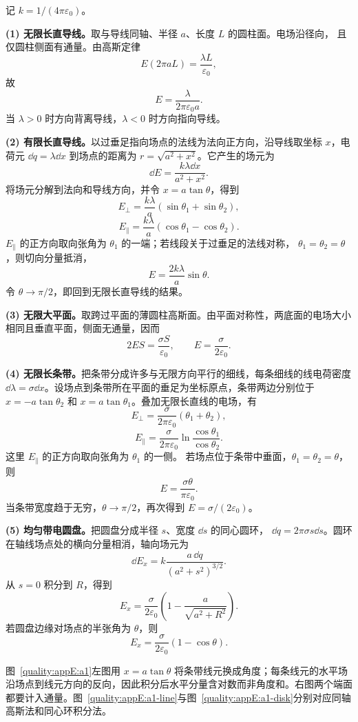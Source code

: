 \begin{xesolution}
记 $k=1/(4\pi\varepsilon_0)$。

\textbf{(1) 无限长直导线。}取与导线同轴、半径 $a$、长度 $L$ 的圆柱面。电场沿径向，
且仅圆柱侧面有通量。由高斯定律
\[
  E(2\pi aL)=\frac{\lambda L}{\varepsilon_0},
\]
故
\[
  \boxed{E=\frac{\lambda}{2\pi\varepsilon_0a}}.
\]
当 $\lambda>0$ 时方向背离导线，$\lambda<0$ 时方向指向导线。

\textbf{(2) 有限长直导线。}以过垂足指向场点的法线为法向正方向，沿导线取坐标 $x$，电荷元
$\dd q=\lambda\dd x$ 到场点的距离为 $r=\sqrt{a^2+x^2}$。它产生的场元为
\[
  \dd E=\frac{k\lambda\dd x}{a^2+x^2}.
\]
将场元分解到法向和导线方向，并令 $x=a\tan\theta$，得到
\[
  \boxed{E_\perp=\frac{k\lambda}{a}
  (\sin\theta_1+\sin\theta_2)},
\]
\[
  \boxed{E_\parallel=\frac{k\lambda}{a}
  (\cos\theta_1-\cos\theta_2)}.
\]
$E_\parallel$ 的正方向取向张角为 $\theta_1$ 的一端；若线段关于过垂足的法线对称，
$\theta_1=\theta_2=\theta$，则切向分量抵消，
\[
  \boxed{E=\frac{2k\lambda}{a}\sin\theta}.
\]
令 $\theta\to\pi/2$，即回到无限长直导线的结果。

\textbf{(3) 无限大平面。}取跨过平面的薄圆柱高斯面。由平面对称性，两底面的电场大小
相同且垂直平面，侧面无通量，因而
\[
  2ES=\frac{\sigma S}{\varepsilon_0},
  \qquad
  \boxed{E=\frac{\sigma}{2\varepsilon_0}}.
\]

\textbf{(4) 无限长条带。}把条带分成许多与无限方向平行的细线，每条细线的线电荷密度
$\dd\lambda=\sigma\dd x$。设场点到条带所在平面的垂足为坐标原点，条带两边分别位于
$x=-a\tan\theta_2$ 和 $x=a\tan\theta_1$。叠加无限长直线的电场，有
\[
  \boxed{E_\perp=\frac{\sigma}{2\pi\varepsilon_0}
  (\theta_1+\theta_2)},
\]
\[
  \boxed{E_\parallel=
  \frac{\sigma}{2\pi\varepsilon_0}
  \ln\frac{\cos\theta_1}{\cos\theta_2}}.
\]
这里 $E_\parallel$ 的正方向取向张角为 $\theta_1$ 的一侧。
若场点位于条带中垂面，$\theta_1=\theta_2=\theta$，则
\[
  \boxed{E=\frac{\sigma\theta}{\pi\varepsilon_0}}.
\]
当条带宽度趋于无穷，$\theta\to\pi/2$，再次得到 $E=\sigma/(2\varepsilon_0)$。

\textbf{(5) 均匀带电圆盘。}把圆盘分成半径 $s$、宽度 $\dd s$ 的同心圆环，
$\dd q=2\pi\sigma s\dd s$。圆环在轴线场点处的横向分量相消，轴向场元为
\[
  \dd E_x=k\frac{a\,\dd q}{(a^2+s^2)^{3/2}}.
\]
从 $s=0$ 积分到 $R$，得到
\[
  \boxed{E_x=\frac{\sigma}{2\varepsilon_0}
  \left(1-\frac{a}{\sqrt{a^2+R^2}}\right)}.
\]
若圆盘边缘对场点的半张角为 $\theta$，则
\[
  \boxed{E_x=\frac{\sigma}{2\varepsilon_0}(1-\cos\theta)}.
\]

图~\ref{quality:appE:a1}左图用 $x=a\tan\theta$ 将条带线元换成角度；每条线元的水平场沿场点到线元方向的反向，因此积分后水平分量含对数而非角度和。右图两个端面都要计入通量。图~\ref{quality:appE:a1-line}与图~\ref{quality:appE:a1-disk}分别对应同轴高斯法和同心环积分法。
\end{xesolution}


